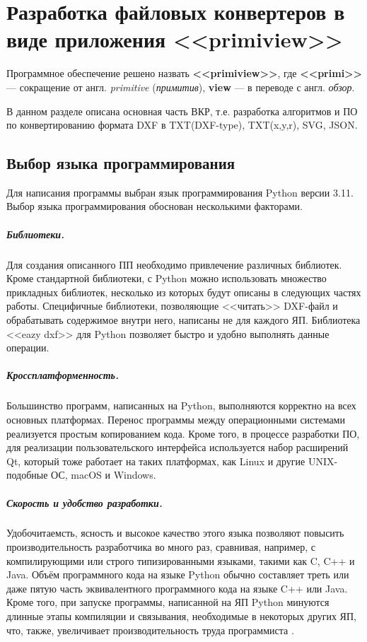\chapter{Разработка файловых конвертеров в виде приложения <<primiview>>}
\label{cha:entwickl}

Программное обеспечение решено назвать \textbf{<<primiview>>}, где \textbf{<<primi>>} --- сокращение от англ. \textit{primitive} (\textit{примитив}), \textbf{view} --- в переводе с англ. \textit{обзор}.

В данном разделе описана основная часть ВКР, т.е. разработка алгоритмов и ПО по конвертированию формата DXF в TXT(DXF-type), TXT(x,y,r), SVG, JSON.

\section{Выбор языка программирования}
Для написания программы выбран язык программирования Python версии 3.11. Выбор языка программирования обоснован несколькими факторами.

\paragraph{Библиотеки.} Для создания описанного ПП необходимо привлечение различных библиотек. Кроме стандартной библиотеки, с Python можно использовать множество прикладных библиотек, несколько из которых будут описаны в следующих частях работы. Специфичные библиотеки, позволяющие <<читать>> DXF-файл и обрабатывать содержимое внутри него, написаны не для каждого ЯП. Библиотека <<eazy dxf>> для Python позволяет быстро и удобно выполнять данные операции.

\paragraph{Кроссплатформенность.} Большинство программ, написанных на Python, выполняются корректно на всех основных платформах. Перенос программы между операционными системами реализуется простым копированием кода. Кроме того, в процессе разработки ПО, для реализации пользовательского интерфейса используется набор расширений Qt, который тоже работает на таких платформах, как Linux и другие UNIX-подобные ОС, macOS и Windows.

\paragraph{Скорость и удобство разработки.} Удобочитаемсть, ясность и высокое качество этого языка позволяют повысить производительность разработчика во много раз, сравнивая, например, с компилирующими или строго типизированными языками, такими как C, C++ и Java. Объём программного кода на языке Python обычно составляет треть или даже пятую часть эквивалентного программного кода на языке C++ или Java. Кроме того, при запуске программы, написанной на ЯП Python минуются длинные этапы компиляции и связывания, необходимые в некоторых других ЯП, что, также, увеличивает производительность труда программиста \cite{ascher2004learning}.

